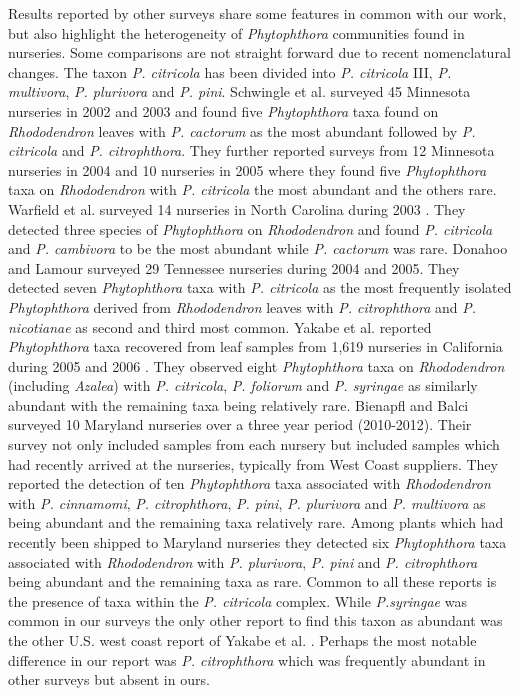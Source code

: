 \documentclass[12pt]{article}
\begin{document}
Results reported by other surveys share some features in common with our work, but also highlight the heterogeneity of \emph{Phytophthora} communities found in nurseries.  Some comparisons are not straight forward due to recent nomenclatural changes.  The taxon \emph{P. citricola} has been divided into \emph{P. citricola} III, \emph{P. multivora}, \emph{P. plurivora} and \emph{P. pini}\cite{jung_burgess_2009, hong2011, ginetti_etal_2013}.  Schwingle et al.\cite{schwingle_etal_2007} surveyed 45 Minnesota nurseries in 2002 and 2003 and found five \emph{Phytophthora} taxa found on \emph{Rhododendron} leaves with \emph{P. cactorum} as the most abundant followed by \emph{P. citricola} and \emph{P. citrophthora}.  They further reported surveys from 12 Minnesota nurseries in 2004 and 10 nurseries in 2005 where they found five \emph{Phytophthora} taxa on \emph{Rhododendron} with \emph{P. citricola} the most abundant and the others rare.  Warfield et al. surveyed 14 nurseries in North Carolina during 2003 \cite{warfield_etal_2008}.  They detected three species of \emph{Phytophthora} on \emph{Rhododendron} and found \emph{P. citricola} and \emph{P. cambivora} to be the most abundant while \emph{P. cactorum} was rare.  Donahoo and Lamour surveyed 29 Tennessee nurseries during 2004 and 2005\cite{donahoo_lamour_2008}.  They detected seven \emph{Phytophthora} taxa with \emph{P. citricola} as the most frequently isolated \emph{Phytophthora} derived from \emph{Rhododendron} leaves with \emph{P. citrophthora} and \emph{P. nicotianae} as second and third most common.  Yakabe et al. reported \emph{Phytophthora} taxa recovered from leaf samples from 1,619 nurseries in California during 2005 and 2006 \cite{yakabe_etal_2009}.  They observed eight \emph{Phytophthora} taxa on \emph{Rhododendron} (including \emph{Azalea}) with \emph{P. citricola}, \emph{P. foliorum} and \emph{P. syringae} as similarly abundant with the remaining taxa being relatively rare.  Bienapfl and Balci \cite{bienapfl_balci_2013} surveyed 10 Maryland nurseries over a three year period (2010-2012).  Their survey not only included samples from each nursery but included samples which had recently arrived at the nurseries, typically from West Coast suppliers.  They reported the detection of ten \emph{Phytophthora} taxa associated with \emph{Rhododendron} with \emph{P. cinnamomi}, \emph{P. citrophthora}, \emph{P. pini}, \emph{P. plurivora} and \emph{P. multivora} as being abundant and the remaining taxa relatively rare.  Among plants which had recently been shipped to Maryland nurseries they detected six \emph{Phytophthora} taxa associated with \emph{Rhododendron} with \emph{P. plurivora}, \emph{P. pini} and \emph{P. citrophthora} being abundant and the remaining taxa as rare.  Common to all these reports is the presence of taxa within the \emph{P. citricola} complex.  While \emph{P.syringae} was common in our surveys the only other report to find this taxon as abundant was the other U.S. west coast report of Yakabe et al. \cite{yakabe_etal_2009}.  Perhaps the most notable difference in our report was \emph{P. citrophthora} which was frequently abundant in other surveys but absent in ours.
\end{document}
